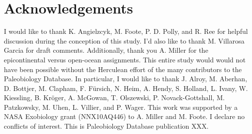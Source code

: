 \documentclass{article}
\begin{document}
\section*{Acknowledgements}
I would like to thank K. Angielzcyk, M. Foote, P. D. Polly, and R. Ree for helpful discussion during the conception of this study. I'd also like to thank M. Villarosa Garcia for draft comments. Additionally, thank you A. Miller for the epicontinental versus open-ocean assignments. This entire study would would not have been possible without the Herculean effort of the many contributors to the Paleobiology Database. In particular, I would like to thank J. Alroy, M. Aberhan, D. Bottjer, M. Clapham, F. F\"{u}rsich, N. Heim, A. Hendy, S. Holland, L. Ivany, W. Kiessling, B. Kr\"{o}ger, A. McGowan, T. Olszewski, P. Novack-Gottshall, M. Patzkowsky, M. Uhen, L. Villier, and P. Wager. This work was supported by a NASA Exobiology grant (NNX10AQ446) to A. Miller and M. Foote. I declare no conflicts of interest. This is Paleobiology Database publication XXX.

\clearpage




\clearpage
\end{document}
